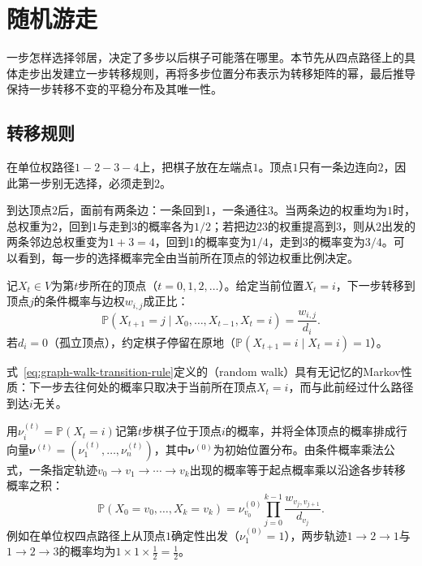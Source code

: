 \section{随机游走}
\label{sec:graph-random-walk}

一步怎样选择邻居，决定了多步以后棋子可能落在哪里。本节先从四点路径上的具体走步出发建立一步转移规则，再将多步位置分布表示为转移矩阵的幂，最后推导保持一步转移不变的平稳分布及其唯一性。

\subsection{转移规则}
\label{sec:graph-walk-rule}

在单位权路径$1\!-\!2\!-\!3\!-\!4$上，把棋子放在左端点$1$。顶点$1$只有一条边连向$2$，因此第一步别无选择，必须走到$2$。

到达顶点$2$后，面前有两条边：一条回到$1$，一条通往$3$。当两条边的权重均为$1$时，总权重为$2$，回到$1$与走到$3$的概率各为$1/2$；若把边$23$的权重提高到$3$，则从$2$出发的两条邻边总权重变为$1+3=4$，回到$1$的概率变为$1/4$，走到$3$的概率变为$3/4$。可以看到，每一步的选择概率完全由当前所在顶点的邻边权重比例决定。

\begin{definition}[随机游走]
\label{def:graph-random-walk}
记$X_t\in V$为第$t$步所在的顶点（$t=0,1,2,\ldots$）。给定当前位置$X_t=i$，下一步转移到顶点$j$的条件概率与边权$w_{i,j}$成正比：
\begin{equation}
\mathbb{P}(X_{t+1}=j\mid X_0,\ldots,X_{t-1},X_t=i)=\frac{w_{i,j}}{d_i}.
\label{eq:graph-walk-transition-rule}
\end{equation}
若$d_i=0$（孤立顶点），约定棋子停留在原地（$\mathbb P(X_{t+1}=i\mid X_t=i)=1$）。
\end{definition}

式~\eqref{eq:graph-walk-transition-rule}定义的（random walk）具有无记忆的Markov性质：下一步去往何处的概率只取决于当前所在顶点$X_t=i$，而与此前经过什么路径到达$i$无关。

用$\nu_i^{(t)}=\mathbb{P}(X_t=i)$记第$t$步棋子位于顶点$i$的概率，并将全体顶点的概率排成行向量$\bm{\nu}^{(t)}=(\nu_1^{(t)},\ldots,\nu_n^{(t)})$，其中$\bm{\nu}^{(0)}$为初始位置分布。由条件概率乘法公式，一条指定轨迹$v_0\to v_1\to\cdots\to v_k$出现的概率等于起点概率乘以沿途各步转移概率之积：
\begin{equation}
\mathbb{P}(X_0=v_0,\ldots,X_k=v_k)
=\nu^{(0)}_{v_0}\prod_{j=0}^{k-1}\frac{w_{v_j,v_{j+1}}}{d_{v_j}}.
\label{eq:graph-walk-path-probability}
\end{equation}
例如在单位权四点路径上从顶点$1$确定性出发（$\nu_1^{(0)}=1$），两步轨迹$1\to 2\to 1$与$1\to 2\to 3$的概率均为$1\times 1\times\frac12=\frac12$。

